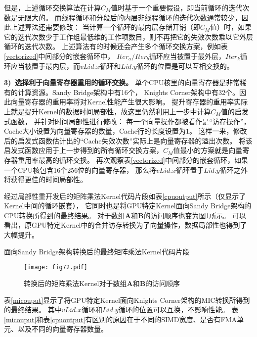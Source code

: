 但是，上述循环交换算法在计算$C_M$值时基于一个重要假设，即当前循环的迭代次数是无限大的。
而线程循环和分段后的内层非线程循环的迭代次数通常较少，因此上述算法还需要修改：
当计算一个循环的最内层存储开销（即$C_M$值）时，如果它的迭代次数少于工作组最低维的工作项数目，则不再把它的失效次数乘以它外层循环的迭代次数。
上述算法有的时候还会产生多个循环交换方案，例如表\ref{vectorized}中间部分的嵌套循环中，
${Iter_a/Iter_b}$循环应当被置于最外层，${Iter_k}$循环应当被置于最内层，而${vLid.x}$循环和${Lid.y}$循环的位置是可以互相交换的。

{\bf 3)\ 选择利于向量寄存器重用的循环交换。} 单个CPU核里的向量寄存器是非常稀有的计算资源。Sandy Bridge架构中有16个，
Knights Corner架构中有32个。因此向量寄存器的重用率将对Kernel性能产生很大影响。
提升寄存器的重用率实际上就是提升Kernel的数据时间局部性，故这里仍然利用上一步中计算$C_M$值的启发式函数，
并针对时间局部性进行修改：
每一个向量操作都被看作是``访存操作''，Cache大小设置为向量寄存器的数量，Cache行的长度设置为$1$。
这样一来，修改后的启发式函数估计出的``Cache失效次数''实际上是向量寄存器的溢出次数。
将该启发式函数应用于上一步得到的所有循环交换方案，$C_M$值最小的方案就是向量寄存器重用率最高的循环交换。
再次观察表\ref{vectorized}中间部分的嵌套循环，如果一个CPU核包含16个256位的向量寄存器，
那么将${vLid.x}$循环置于${Lid.y}$循环之外将获得更佳的时间局部性。

经过局部性重开发后的矩阵乘法Kernel代码片段如表\ref{cpuoutput}所示（仅显示了Kernel中间的循环嵌套），
它同时也是将GPU特定Kernel面向Sandy Bridge架构的CPU转换所得到的最终结果。
对于数组$\bm{A}$和$\bm{B}$的访问顺序也变为图\ref{access2}所示。
可以看出，原GPU特定Kernel中的合并访存转换为了向量操作，数据局部性也得到了大幅提升。

\begin{table}[htb]
	\centering
	\caption{面向Sandy Bridge架构转换后的最终矩阵乘法Kernel代码片段}
	\label{cpuoutput}
\end{table}

\begin{figure}[htb]
\centering
\texttt{[image: fig72.pdf]}
\caption{转换后的矩阵乘法Kernel对于数组$\bm{A}$和$\bm{B}$的访问顺序}
\label{access2}
\end{figure}

表\ref{micouput}显示了将GPU特定Kernel面向Knights Corner架构的MIC转换所得到的最终结果。
其中${vLid.x}$循环和${Lid.y}$循环的位置可以互换，不影响性能。
表\ref{micouput}和表\ref{cpuoutput}有区别的原因在于不同的SIMD宽度、是否有FMA单元、以及不同的向量寄存器数量。


